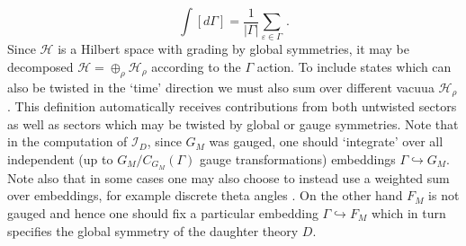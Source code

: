 \documentclass[main.tex]{subfiles}
\begin{document}
\begin{equation}
\int[d\Gamma]=\frac{1}{|\Gamma|}\sum_{\varepsilon\in\Gamma}\,.
\end{equation}
Since $\mathcal{H}$ is a Hilbert space with grading by global symmetries, it may be decomposed $\mathcal{H}=\oplus_{\rho}\mathcal{H}_{\rho}$ according to the $\Gamma$ action. To include states which can also be twisted in the `time' direction we must also sum over different vacuua $\mathcal{H}_{\rho}$. This definition automatically receives contributions from both untwisted sectors as well as sectors which may be twisted by global or gauge symmetries. Note that in the computation of $\mathcal{I}_D$, since $G_M$ was gauged, one should `integrate' over all independent (up to $G_M/C_{G_M}\left(\Gamma\right)$ gauge transformations) embeddings $\Gamma\hookrightarrow G_M$. Note also that in some cases one may also choose to instead use a weighted sum over embeddings, for example discrete theta angles \cite{Razamat:2013opa}. On the other hand $F_M$ is not gauged and hence one should fix a particular embedding $\Gamma\hookrightarrow F_M$ which in turn specifies the global symmetry of the daughter theory $D$.
\end{document}
